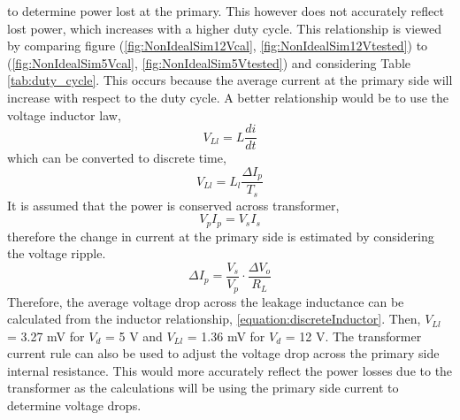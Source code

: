 \documentclass[12pt,twoside]{scrartcl}
\begin{document}
to determine power lost at the primary. This however does not accurately reflect lost power, which increases with a higher duty cycle. 
This relationship is viewed by comparing figure (\ref{fig:NonIdealSim12Vcal}, \ref{fig:NonIdealSim12Vtested}) to (\ref{fig:NonIdealSim5Vcal}, \ref{fig:NonIdealSim5Vtested}) and considering Table \ref{tab:duty_cycle}.
This occurs because the average current at the primary side will increase with respect to the duty cycle. A better relationship would be to use the voltage inductor law,
\begin{equation}
    V_{Ll} = L \dfrac{di}{dt}
\end{equation} 
which can be converted to discrete time,
\begin{equation}
    V_{Ll} = L_l \dfrac{\Delta I_p}{T_s}
    \label{equation:discreteInductor}
\end{equation}
It is assumed that the power is conserved across transformer,
\begin{equation}
    V_pI_p = V_sI_s
\end{equation}
therefore the change in current at the primary side is estimated by considering the voltage ripple.
\begin{equation}
    \Delta I_p = \dfrac{V_s}{V_p} \cdot \dfrac{\Delta V_o}{R_L}
\end{equation} 
Therefore, the average voltage drop across the leakage inductance 
can be calculated from the inductor relationship, \ref{equation:discreteInductor}. Then, 
$V_{Ll}$ = 3.27 mV for $V_d$ = 5 V and $V_{Ll}$ = 1.36 mV for $V_d$ = 12 V. The transformer current rule
can also be used to adjust the voltage drop across the primary side internal resistance. This would more accurately 
reflect the power losses due to the transformer as the calculations will be using the primary side current to 
determine voltage drops. 


\newpage


\end{document}
